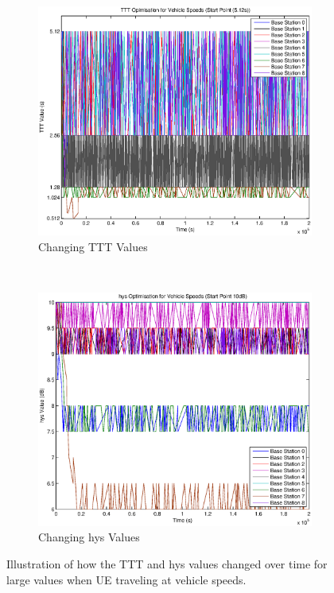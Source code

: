 \begin{figure}[H]
        \centering
        \begin{subfigure}[b]{0.49\textwidth}
                \includegraphics[width=\textwidth]{figures/vehicle_figures/high/long_ttt.eps}
                \caption{Changing TTT Values}
                \label{fig:veh_high_ttt}
        \end{subfigure}%
        ~ %
        \begin{subfigure}[b]{0.49\textwidth}
                \includegraphics[width=\textwidth]{figures/vehicle_figures/high/long_hys.eps}
                \caption{Changing hys Values}
                \label{fig:veh_high_hys}
        \end{subfigure}
        \caption{Illustration of how the TTT and hys values changed over time for large values when UE traveling at vehicle speeds.}\label{fig:veh_high_ttthys}
\end{figure}

